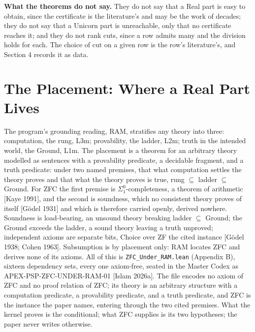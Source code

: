 \documentclass[10pt,twocolumn]{article}
\begin{document}
\textbf{What the theorems do not say.} They do not say that a Real part
is easy to obtain, since the certificate is the literature's and may be
the work of decades; they do not say that a Unicorn part is unreachable,
only that no certificate reaches it; and they do not rank cuts, since a
row admits many and the division holds for each. The choice of cut on a
given row is the row's literature's, and Section 4 records it as data.

\hypertarget{the-placement-where-a-real-part-lives}{%
\section{The Placement: Where a Real Part
Lives}\label{the-placement-where-a-real-part-lives}}

The program's grounding reading, RAM, stratifies any theory into three:
computation, the rung, L3m; provability, the ladder, L2m; truth in the
intended world, the Ground, L1m. The placement is a theorem for an
arbitrary theory modelled as sentences with a provability predicate, a
decidable fragment, and a truth predicate: under two named premises,
that what computation settles the theory proves and that what the theory
proves is true, rung \(\subseteq\) ladder \(\subseteq\) Ground. For ZFC
the first premise is \(\Sigma^0_1\)-completeness, a theorem of
arithmetic {[}Kaye 1991{]}, and the second is soundness, which no
consistent theory proves of itself {[}Gödel 1931{]} and which is
therefore carried openly, derived nowhere. Soundness is load-bearing, an
unsound theory breaking ladder \(\subseteq\) Ground; the Ground exceeds
the ladder, a sound theory leaving a truth unproved; independent axioms
are separate bits, Choice over ZF the cited instance {[}Gödel 1938;
Cohen 1963{]}. Subsumption is by placement only: RAM locates ZFC and
derives none of its axioms. All of this is \texttt{ZFC\_Under\_RAM.lean}
(Appendix B), sixteen dependency sets, every one axiom-free, seated in
the Master Codex as APEX-PSP-ZFC-UNDER-RAM-01 {[}Islam 2026a{]}. The
file encodes no axiom of ZFC and no proof relation of ZFC; its theory is
an arbitrary structure with a computation predicate, a provability
predicate, and a truth predicate, and ZFC is the instance the paper
names, entering through the two cited premises. What the kernel proves
is the conditional; what ZFC supplies is its two hypotheses; the paper
never writes otherwise.
\end{document}
